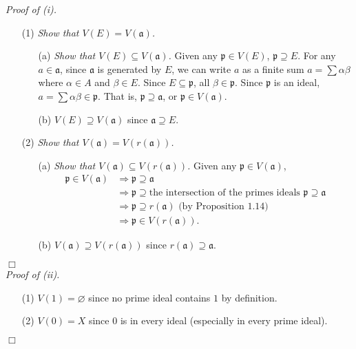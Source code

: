 \documentclass{article}
\begin{document}
\emph{Proof of (i).}
\begin{enumerate}
\item[(1)]
\emph{Show that $V(E) = V(\mathfrak{a})$.}
  \begin{enumerate}
  \item[(a)]
  \emph{Show that $V(E) \subseteq V(\mathfrak{a})$.}
  Given any $\mathfrak{p} \in V(E)$, $\mathfrak{p} \supseteq E$.
  For any $a \in \mathfrak{a}$,
  since $\mathfrak{a}$ is generated by $E$,
  we can write $a$ as a finite sum
  $a = \sum \alpha \beta$ where $\alpha \in A$ and $\beta \in E$.
  Since $E \subseteq \mathfrak{p}$, all $\beta \in \mathfrak{p}$.
  Since $\mathfrak{p}$ is an ideal,
  $a = \sum \alpha \beta \in \mathfrak{p}$.
  That is, $\mathfrak{p} \supseteq \mathfrak{a}$,
  or $\mathfrak{p} \in V(\mathfrak{a})$.
  \item[(b)]
  \emph{$V(E) \supseteq V(\mathfrak{a})$} since $\mathfrak{a} \supseteq E$.
  \end{enumerate}
\item[(2)]
\emph{Show that $V(\mathfrak{a}) = V(r(\mathfrak{a}))$.}
  \begin{enumerate}
  \item[(a)]
  \emph{Show that $V(\mathfrak{a}) \subseteq V(r(\mathfrak{a}))$.}
  Given any $\mathfrak{p} \in V(\mathfrak{a})$,
  \begin{align*}
  \mathfrak{p} \in V(\mathfrak{a})
  &\Longrightarrow \mathfrak{p} \supseteq \mathfrak{a} \\
  &\Longrightarrow \mathfrak{p} \supseteq \text{the intersection of the primes ideals }
  \mathfrak{p} \supseteq \mathfrak{a} \\
  &\Longrightarrow \mathfrak{p} \supseteq r(\mathfrak{a}) \text{ (by Proposition 1.14)}\\
  &\Longrightarrow \mathfrak{p} \in V(r(\mathfrak{a})).
  \end{align*}
  \item[(b)]
  \emph{$V(\mathfrak{a}) \supseteq V(r(\mathfrak{a}))$}
  since $r(\mathfrak{a}) \supseteq \mathfrak{a}$.
  \end{enumerate}
\end{enumerate}
$\Box$ \\

\emph{Proof of (ii).}
\begin{enumerate}
\item[(1)]
\emph{$V(1) = \varnothing$} since no prime ideal contains $1$ by definition.
\item[(2)]
\emph{$V(0) = X$} since $0$ is in every ideal (especially in every prime ideal).
\end{enumerate}
$\Box$ \\
\end{document}
